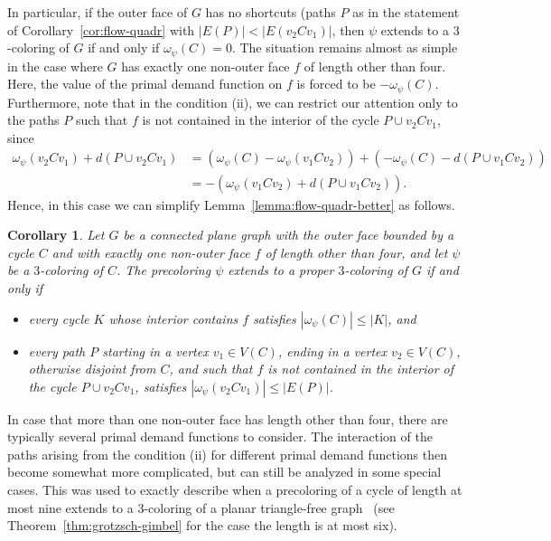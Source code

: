 \documentclass[12pt,twoside,openright,a4paper]{book}
\newtheorem{corollary}[theorem]{Corollary}
\begin{document}
In particular, if the outer face of $G$ has no shortcuts (paths $P$ as in the statement of Corollary~\ref{cor:flow-quadr}
with $|E(P)|<|E(v_2Cv_1)|$, then $\psi$ extends to a $3$-coloring of $G$ if and only if $\omega_\psi(C)=0$.
The situation remains almost as simple in the case where $G$ has exactly one non-outer face $f$ of length other than four.
Here, the value of the primal demand function on $f$ is forced to be $-\omega_\psi(C)$.
Furthermore, note that in the condition (ii), we can restrict our attention only to the paths $P$ such that
$f$ is not contained in the interior of the cycle $P\cup v_2Cv_1$, since
\begin{align*}
\omega_\psi(v_2Cv_1)+d(P\cup v_2Cv_1)&=(\omega_\psi(C)-\omega_\psi(v_1Cv_2))+(-\omega_\psi(C)-d(P\cup v_1Cv_2))\\
&=-(\omega_\psi(v_1Cv_2)+d(P\cup v_1Cv_2)).
\end{align*}
Hence, in this case we can simplify Lemma~\ref{lemma:flow-quadr-better} as follows.
\begin{corollary}\label{cor:flow-oneface}
Let $G$ be a connected plane graph with the outer face bounded by a cycle $C$ and with exactly one non-outer face $f$ of length other than four,
and let $\psi$ be a $3$-coloring of $C$.
The precoloring $\psi$ extends to a proper $3$-coloring of $G$ if and only if 
\begin{itemize}
\item[(i)] every cycle $K$ whose interior contains $f$ satisfies $|\omega_\psi(C)|\le |K|$, and
\item[(ii)] every path $P$ starting in a vertex $v_1\in V(C)$, ending in a vertex $v_2\in V(C)$,
otherwise disjoint from $C$, and such that $f$ is not contained in the interior of the cycle $P\cup v_2Cv_1$,
satisfies $|\omega_\psi(v_2Cv_1)|\le |E(P)|$.
\end{itemize}
\end{corollary}

In case that more than one non-outer face has length other than four, there are typically several primal demand functions
to consider.  The interaction of the paths arising from the condition (ii) for different primal demand functions then become
somewhat more complicated, but can still be analyzed in some special cases.  This was used to exactly describe when a precoloring
of a cycle of length at most nine extends to a $3$-coloring of a planar triangle-free graph~\cite{col8cyc,col9cyc} (see Theorem~\ref{thm:grotzsch-gimbel}
for the case the length is at most six).
\end{document}
